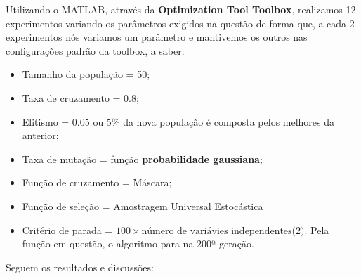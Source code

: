 \documentclass[a4paper, 12pt]{article}
\begin{document}
	Utilizando o MATLAB\textregistered, através da \textbf{Optimization Tool Toolbox}, realizamos 12 experimentos variando os parâmetros exigidos na questão de forma que, a cada 2 experimentos nós variamos um parâmetro e mantivemos os outros nas configurações padrão da toolbox, a saber:
		\begin{itemize}
			\item Tamanho da população = 50;
			\item Taxa de cruzamento = 0.8;
			\item Elitismo = 0.05 ou 5\% da nova população é composta pelos melhores da anterior;
			\item Taxa de mutação = função \textbf{probabilidade gaussiana};
			\item Função de cruzamento = Máscara;
			\item Função de seleção = Amostragem Universal Estocástica
			\item Critério de parada = $100\times\text{número de variávies independentes(2)}$.  Pela função em questão, o algoritmo para na 200ª geração.
		\end{itemize}
	  Seguem os resultados e discussões:
\end{document}
